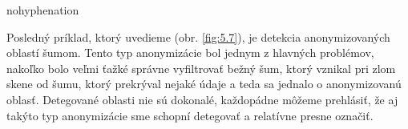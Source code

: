 \begin{hyphenrules}{nohyphenation}
\begin{figure}[H]
\begin{minipage}[b]{.4\linewidth}
\end{minipage}
\end{figure}

Posledný príklad, ktorý uvedieme (obr. \ref{fig:5.7}), je detekcia anonymizovaných oblastí šumom. Tento typ anonymizácie bol jednym z hlavných problémov, nakoľko bolo veľmi ťažké správne vyfiltrovať bežný šum, ktorý vznikal pri zlom skene od šumu, ktorý prekrýval nejaké údaje a teda sa jednalo o anonymizovanú oblasť. Detegované oblasti nie sú dokonalé, každopádne môžeme prehlásiť, že aj takýto typ anonymizácie sme schopní detegovať a relatívne presne označiť.



\end{hyphenrules}
